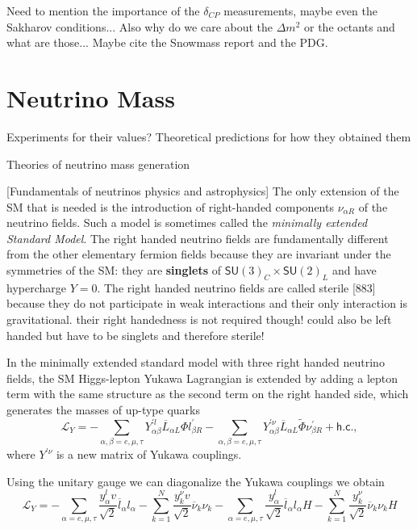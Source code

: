 Need to mention the importance of the $\delta_{CP}$ measurements, maybe even the Sakharov conditions... Also why do we care about the $\Delta m^2$ or the octants and what are those... Maybe cite the Snowmass report and the PDG.

\section{Neutrino Mass}
Experiments for their values? Theoretical predictions for how they obtained them

Theories of neutrino mass generation

[Fundamentals of neutrinos physics and astrophysics]
The only extension of the SM that is needed is the introduction of right-handed components $\nu_{\alpha R}$ of the neutrino fields. Such a model is sometimes called the \textit{minimally extended Standard Model}. The right handed neutrino fields are fundamentally different from the other elementary fermion fields because they are invariant under the symmetries of the SM: they are \textbf{singlets} of $\textsf{SU}(3)_C\times\textsf{SU}(2)_L$ and have hypercharge $Y=0$. The right handed neutrino fields are called sterile [883] because they do not participate in weak interactions and their only interaction is gravitational. their right handedness is not required though! could also be left handed but have to be singlets and therefore sterile!

In the minimally extended standard model with three right handed neutrino fields, the SM Higgs-lepton Yukawa Lagrangian is extended by adding a lepton term with the same structure as the second term on the right handed side, which generates the masses of up-type quarks
\begin{equation}
\mathcal{L}_Y=
-\sum_{\alpha,\beta=e,\mu,\tau} Y_{\alpha\beta}^{\prime l} \overline{L}_{\alpha L}\Phi l_{\beta R}^{\prime}
-\sum_{\alpha,\beta=e,\mu,\tau} Y_{\alpha\beta}^{\prime \nu} \overline{L}_{\alpha L}\tilde{\Phi} \nu_{\beta R}^{\prime}
+\textsf{h.c.},
\end{equation}
where $Y^{\prime \nu}$ is a new matrix of Yukawa couplings.

Using the unitary gauge we can diagonalize the Yukawa couplings we obtain
\begin{equation}
\mathcal{L}_Y=
-\sum_{\alpha=e,\mu,\tau}\frac{y_\alpha^l v}{\sqrt{2}}\overline{l}_\alpha l_\alpha
-\sum_{k=1}^N \frac{y_k^\nu v}{\sqrt{2}}\overline{\nu}_k\nu_k
-\sum_{\alpha=e,\mu,\tau}\frac{y_\alpha^l}{\sqrt{2}}\overline{l}_\alpha l_\alpha H
-\sum_{k=1}^N \frac{y_k^\nu}{\sqrt{2}}\overline{\nu}_k\nu_k H
\end{equation}

